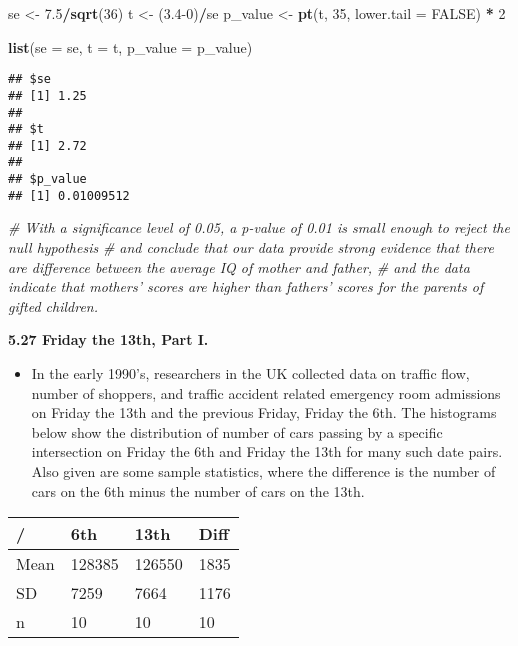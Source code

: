 \documentclass[]{book}
\newenvironment{Shaded}{\begin{snugshade}}{\end{snugshade}}
\newcommand{\CommentTok}[1]{\textcolor[rgb]{0.56,0.35,0.01}{\textit{#1}}}
\newcommand{\DataTypeTok}[1]{\textcolor[rgb]{0.13,0.29,0.53}{#1}}
\newcommand{\DecValTok}[1]{\textcolor[rgb]{0.00,0.00,0.81}{#1}}
\newcommand{\FloatTok}[1]{\textcolor[rgb]{0.00,0.00,0.81}{#1}}
\newcommand{\KeywordTok}[1]{\textcolor[rgb]{0.13,0.29,0.53}{\textbf{#1}}}
\newcommand{\NormalTok}[1]{#1}
\newcommand{\OperatorTok}[1]{\textcolor[rgb]{0.81,0.36,0.00}{\textbf{#1}}}
\newcommand{\OtherTok}[1]{\textcolor[rgb]{0.56,0.35,0.01}{#1}}
\newcommand{\StringTok}[1]{\textcolor[rgb]{0.31,0.60,0.02}{#1}}
\providecommand{\tightlist}{%
  \setlength{\itemsep}{0pt}\setlength{\parskip}{0pt}}
\begin{document}
\begin{Shaded}
\begin{Highlighting}[]
\NormalTok{se <-}\StringTok{ }\FloatTok{7.5}\OperatorTok{/}\KeywordTok{sqrt}\NormalTok{(}\DecValTok{36}\NormalTok{)}
\NormalTok{t <-}\StringTok{ }\NormalTok{(}\FloatTok{3.4}\DecValTok{-0}\NormalTok{)}\OperatorTok{/}\NormalTok{se}
\NormalTok{p_value <-}\StringTok{ }\KeywordTok{pt}\NormalTok{(t, }\DecValTok{35}\NormalTok{, }\DataTypeTok{lower.tail =} \OtherTok{FALSE}\NormalTok{) }\OperatorTok{*}\StringTok{ }\DecValTok{2}

\KeywordTok{list}\NormalTok{(}\DataTypeTok{se =}\NormalTok{ se, }\DataTypeTok{t =}\NormalTok{ t, }\DataTypeTok{p_value =}\NormalTok{ p_value)}
\end{Highlighting}
\end{Shaded}

\begin{verbatim}
## $se
## [1] 1.25
## 
## $t
## [1] 2.72
## 
## $p_value
## [1] 0.01009512
\end{verbatim}

\begin{Shaded}
\begin{Highlighting}[]
\CommentTok{# With a significance level of 0.05, a p-value of 0.01 is small enough to reject the null hypothesis}
\CommentTok{# and conclude that our data provide strong evidence that there are difference between the average IQ of mother and father,}
\CommentTok{# and the data indicate that mothers’ scores are higher than fathers’ scores for the parents of gifted children.}
\end{Highlighting}
\end{Shaded}

\textbf{5.27 Friday the 13th, Part I.}

\begin{itemize}
\tightlist
\item
  In the early 1990's, researchers in the UK collected data on traffic flow, number of shoppers, and traffic accident related emergency room admissions on Friday the 13th and the previous Friday, Friday the 6th. The histograms below show the distribution of number of cars passing by a specific intersection on Friday the 6th and Friday the 13th for many such date pairs. Also given are some sample statistics, where the difference is the number of cars on the 6th minus the number of cars on the 13th.
\end{itemize}

\begin{longtable}[]{@{}llll@{}}
\toprule
/ & 6th & 13th & Diff\tabularnewline
\midrule
\endhead
Mean & 128385 & 126550 & 1835\tabularnewline
SD & 7259 & 7664 & 1176\tabularnewline
n & 10 & 10 & 10\tabularnewline
\bottomrule
\end{longtable}
\end{document}
